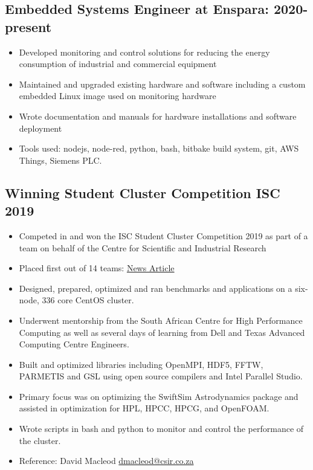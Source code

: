 \documentclass[10pt,a4paper,notitlepage]{article}
\begin{document}
\subsection*{Embedded Systems Engineer at Enspara: 2020-present}
\begin{itemize}[noitemsep]
	\setlength\itemsep{0.02em}
    \item Developed monitoring and control solutions for reducing the energy consumption of industrial and commercial equipment
    \item Maintained and upgraded existing hardware and software including a custom embedded Linux image used on monitoring hardware
    \item Wrote documentation and manuals for hardware installations and software deployment
    \item Tools used: nodejs, node-red, python, bash, bitbake build system, git, AWS Things, Siemens PLC.
\end{itemize}

\subsection*{Winning Student Cluster Competition ISC 2019}
\begin{itemize}[noitemsep]
	\setlength\itemsep{0.02em}
    \item Competed in and won the ISC Student Cluster Competition 2019 as part of a team on behalf of the Centre for Scientific and Industrial Research
    \item Placed first out of 14 teams: \href{https://www.chpc.ac.za/index.php/news2/241-south-africa-wins-international-student-cluster-competition-for-the-fourth-time}{News Article}
    \item Designed, prepared, optimized and ran benchmarks and applications on a six-node, 336 core CentOS cluster.
    \item Underwent mentorship from the South African Centre for High Performance Computing as well
        as several days of learning from Dell and Texas Advanced Computing Centre Engineers.
    \item Built and optimized libraries including OpenMPI, HDF5, FFTW, PARMETIS and GSL using open source compilers and Intel Parallel Studio.
    \item Primary focus was on optimizing the SwiftSim Astrodynamics package and assisted in optimization for HPL, HPCC, HPCG, and OpenFOAM.
    \item Wrote scripts in bash and python to monitor and control the performance of the cluster. 
    \item Reference: David Macleod \href{mailto:dmacleod@csir.co.za}{dmacleod@csir.co.za}
\end{itemize}
\end{document}
